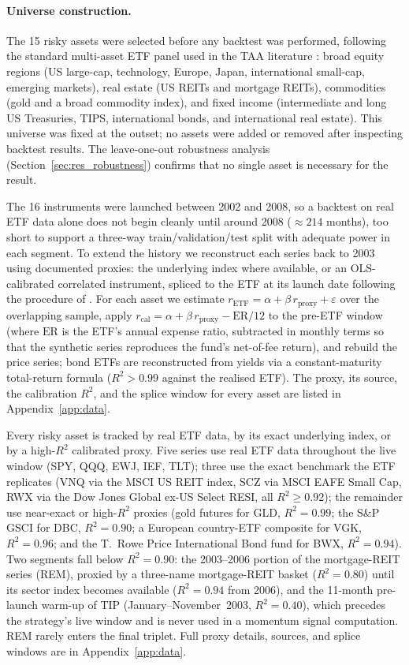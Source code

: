\paragraph{Universe construction.}
The 15 risky assets were selected before any backtest was performed, following the
standard multi-asset ETF panel used in the TAA literature
\citep{faber2007, antonacci2014, keller2017}: broad equity regions (US large-cap,
technology, Europe, Japan, international small-cap, emerging markets), real estate
(US REITs and mortgage REITs), commodities (gold and a broad commodity index), and
fixed income (intermediate and long US Treasuries, TIPS, international bonds, and
international real estate). This universe was fixed at the outset; no assets were
added or removed after inspecting backtest results. The leave-one-out robustness
analysis (Section~\ref{sec:res_robustness}) confirms that no single asset is
necessary for the result.

The 16 instruments were launched between 2002 and 2008, so a backtest on real ETF
data alone does not begin cleanly until around 2008 ($\approx 214$ months), too
short to support a three-way train/validation/test split with adequate power in
each segment.
To extend the history we reconstruct each series back to 2003 using documented
proxies: the underlying index where available, or an OLS-calibrated correlated
instrument, spliced to the ETF at its launch date following the procedure of
\citet{keller2017}.
For each asset we estimate $r_{\text{ETF}} = \alpha + \beta\, r_{\text{proxy}} +
\varepsilon$ over the overlapping sample, apply
$r_{\text{cal}} = \alpha + \beta\, r_{\text{proxy}} - \text{ER}/12$ to the pre-ETF
window (where $\text{ER}$ is the ETF's annual expense ratio, subtracted in monthly
terms so that the synthetic series reproduces the fund's net-of-fee return), and
rebuild the price series; bond ETFs are reconstructed from yields via a
constant-maturity total-return formula ($R^2 > 0.99$ against the realised ETF). The
proxy, its source, the calibration $R^2$, and the splice window for every asset are
listed in Appendix~\ref{app:data}.

Every risky asset is tracked by real ETF data, by its exact underlying index, or
by a high-$R^2$ calibrated proxy. Five series use real ETF data throughout the live
window (SPY, QQQ, EWJ, IEF, TLT); three use the exact benchmark the ETF replicates
(VNQ via the MSCI US REIT index, SCZ via MSCI EAFE Small Cap, RWX via the Dow Jones
Global ex-US Select RESI, all $R^2 \geq 0.92$); the remainder use near-exact or
high-$R^2$ proxies (gold futures for GLD, $R^2 = 0.99$; the S\&P GSCI for DBC,
$R^2 = 0.90$; a European country-ETF composite for VGK, $R^2 = 0.96$; and the T.\
Rowe Price International Bond fund for BWX, $R^2 = 0.94$). Two segments fall below
$R^2 = 0.90$: the 2003--2006 portion of the mortgage-REIT series (REM), proxied by a
three-name mortgage-REIT basket ($R^2 = 0.80$) until its sector index becomes
available ($R^2 = 0.94$ from 2006), and the 11-month pre-launch warm-up of TIP
(January--November~2003, $R^2 = 0.40$), which precedes the strategy's live window
and is never used in a momentum signal computation. REM rarely enters the final
triplet. Full proxy details, sources, and splice windows are in
Appendix~\ref{app:data}.

